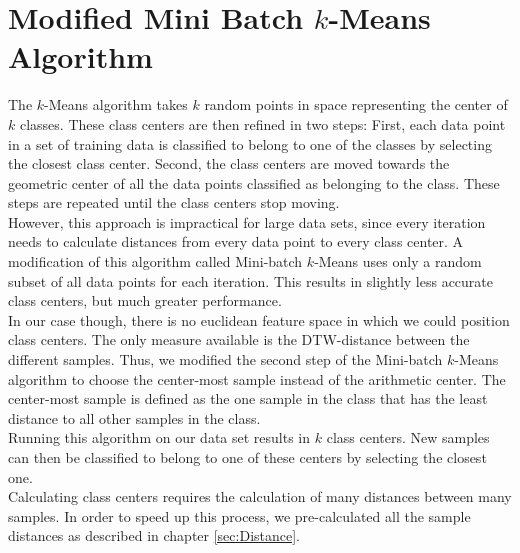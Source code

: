 \section{Modified Mini Batch $k$-Means Algorithm}
\label{sec:TheoryKMeans}
The $k$-Means algorithm takes $k$ random points in space representing the center of $k$ classes. These class centers are then refined in two steps: First, each data point in a set of training data is classified to belong to one of the classes by selecting the closest class center. Second, the class centers are moved towards the geometric center of all the data points classified as belonging to the class. These steps are repeated until the class centers stop moving.\\
However, this approach is impractical for large data sets, since every iteration needs to calculate distances from every data point to every class center. A modification of this algorithm called Mini-batch $k$-Means \cite{bib:Elkan2003} uses only a random subset of all data points for each iteration. This results in slightly less accurate class centers, but much greater performance.\\
In our case though, there is no euclidean feature space in which we could position class centers. The only measure available is the DTW-distance between the different samples. Thus, we modified the second step of the Mini-batch $k$-Means algorithm to choose the center-most sample instead of the arithmetic center. The center-most sample is defined as the one sample in the class that has the least distance to all other samples in the class.\\
Running this algorithm on our data set results in $k$ class centers. New samples can then be classified to belong to one of these centers by selecting the closest one.\\
Calculating class centers requires the calculation of many distances between many samples. In order to speed up this process, we pre-calculated all the sample distances as described in chapter \ref{sec:Distance}.
